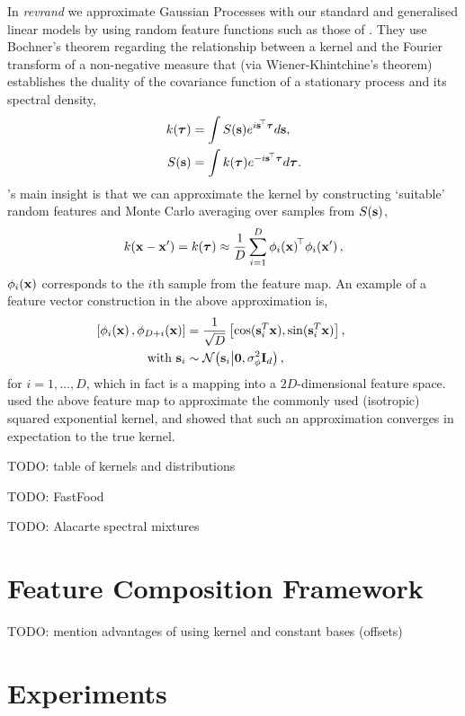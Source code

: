 \documentclass[11pt, oneside]{article}
\begin{document}
In \emph{revrand} we approximate Gaussian Processes with our standard and
generalised linear models by using random feature functions such as those of
\citeauthor{rahimi2007} \citeyearpar{rahimi2007,rahimi2008}. They use Bochner's
theorem regarding the relationship between a kernel and the Fourier transform
of a non-negative measure that (via Wiener-Khintchine's theorem) establishes
the duality of the covariance function of a stationary process and its spectral
density,
\begin{align}
	k(\boldsymbol{\tau}) &= \int S(\mathbf{s}) 
    e^{i \mathbf{s}^{\!\top}  \boldsymbol{\tau}} d \mathbf{s},  \\
	S(\mathbf{s}) &= \int k(\boldsymbol{\tau}) 
    e^{- i \mathbf{s}^{\!\top} \boldsymbol{\tau}}  d \boldsymbol{\tau}.
	\label{eq:fourier}
\end{align}
\citeauthor{rahimi2007}'s  main insight \citeyearpar{rahimi2007} is that we can
approximate the kernel by constructing `suitable' random features and Monte 
Carlo averaging over samples from $S(\mathbf{s})$,
\begin{equation}
    k(\mathbf{x} - \mathbf{x}') = k(\boldsymbol{\tau}) 
    \approx \frac{1}{D} \sum_{i=1}^{D} \phi_{i}\!\left({{\mathbf{x}}}\right)^{\!\top}\!
	\phi_{i}\!\left({{\mathbf{x}'}}\right),
	\label{eq:mcapprox}
\end{equation}
$\phi_{i}\!\left({{\mathbf{x}}}\right)$ corresponds to the $i$th sample from the feature
map. An example of a feature vector construction in the above approximation is,
\begin{align}
	\nonumber
    \left[{\phi_{i}\!\left({{\mathbf{x}}}\right), \phi_{D+i}\!\left({{\mathbf{x}}}\right)}\right]&= 
    \frac{1}{\sqrt{D}} \left[{\cos(\mathbf{s}_i^T \mathbf{x}), 
    \sin(\mathbf{s}_i^T \mathbf{x})}\right], \qquad \\
    \text{with}~\mathbf{s}_i & \sim 
    \mathcal{N}\!\left({\mathbf{s}_i}\middle\vert{\mathbf{0}, \sigma_{\ensuremath{\phi}}^2\ensuremath{\mathbf{I}_{d}}}\right),
\end{align}
for $i=1, \ldots, D$,  which in fact is a mapping into a $2 D$-dimensional
feature space.  \citet{rahimi2007} used the above feature map to approximate
the commonly used (isotropic) squared exponential kernel, and showed that such
an approximation converges in expectation to the true kernel.  

TODO: table of kernels and distributions

TODO: FastFood

TODO: Alacarte spectral mixtures

\section{Feature Composition Framework}

TODO: mention advantages of using kernel and constant bases (offsets)

\section{Experiments}



\end{document}
